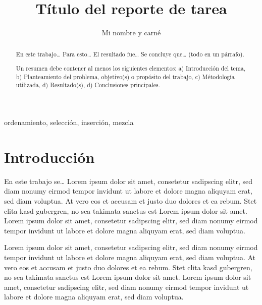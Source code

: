\documentclass[twocolumn,english,spanish,journal]{IEEEtran}
\begin{document}
\title{Título del reporte de tarea}


\author{Mi nombre y carné}

%

\maketitle
{}%


\begin{abstract}
En este trabajo\ldots{} Para esto\ldots{} El resultado fue\ldots{}
Se concluye que\ldots{} (todo en un párrafo).

Un resumen debe contener al menos los siguientes elementos: a) Introducción del tema, b) Planteamiento del problema, objetivo(s) o propósito del trabajo, c) Métodología utilizada, d) Resultado(s), d) Conclusiones principales.
\end{abstract}

\renewcommand\IEEEkeywordsname{Palabras clave}
\begin{IEEEkeywords}
ordenamiento, selección, inserción, mezcla
\end{IEEEkeywords}

\section{Introducción}

En este trabajo se\ldots{} Lorem ipsum dolor sit
amet, consetetur sadipscing elitr, sed diam nonumy eirmod tempor invidunt ut labore et dolore magna aliquyam erat, sed diam voluptua. At vero eos et accusam et justo duo dolores et ea rebum. Stet clita kasd gubergren, no sea takimata sanctus est Lorem ipsum dolor sit amet. Lorem ipsum dolor sit amet, consetetur sadipscing elitr, sed diam nonumy eirmod tempor invidunt ut labore et dolore magna aliquyam erat, sed diam voluptua.

Lorem ipsum dolor sit amet, consetetur sadipscing elitr, sed diam nonumy eirmod tempor invidunt ut labore et dolore magna aliquyam erat, sed diam voluptua. At vero eos et accusam et justo duo dolores et ea rebum. Stet clita kasd gubergren, no sea takimata sanctus est Lorem ipsum dolor sit amet. Lorem ipsum dolor sit amet, consetetur sadipscing elitr, sed diam nonumy eirmod tempor invidunt ut labore et dolore magna aliquyam erat, sed diam voluptua.
\end{document}

